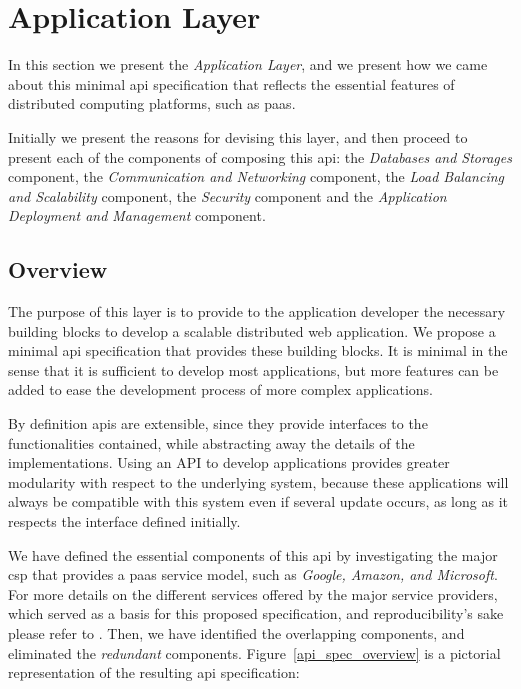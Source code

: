 \documentclass[12pt, titlepage]{uo_temp}
\begin{document}
     \section{Application Layer}
     In this section we present the \emph{Application Layer}, and we present how we came
     about this minimal \gls{api} specification that reflects the essential features of
     distributed computing platforms, such as \gls{paas}. 

     Initially we present the reasons for devising this layer, and then proceed to present
     each of the components of composing this \gls{api}: the \emph{Databases and Storages}
     component, the \emph{Communication and Networking} component, the \emph{Load
       Balancing and Scalability} component, the \emph{Security} component and the
     \emph{Application Deployment and Management} component.
     
     \subsection{Overview}
     The purpose of this layer is to provide to the application developer the necessary
     building blocks to develop a scalable distributed web application. We propose a
     minimal \gls{api} specification that provides these building blocks. It is minimal in
     the sense that it is sufficient to develop most applications, but more features
     can be added to ease the development process of more complex applications.

     By definition \gls{api}s are extensible, since they provide interfaces to the
     functionalities contained, while abstracting away the details of the
     implementations. Using an API to develop applications provides greater modularity
     with respect to the underlying system, because these applications will always be
     compatible with this system even if several update occurs, as long as it respects the
     interface defined initially. 

     We have defined the essential components of this \gls{api} by investigating the major
     \gls{csp} that provides a \gls{paas} service model, such as \emph{Google, Amazon, and
       Microsoft}. For more details on the different services offered by the major service
     providers, which served as a basis for this proposed specification, and
     reproducibility's sake please refer to \cite{gae_web} \cite{AWS} \cite{azure}. Then,
     we have identified the overlapping components, and eliminated the \emph{redundant}
     components. Figure~\ref{api_spec_overview} is a pictorial representation of the
     resulting \gls{api} specification:
     
\end{document}
